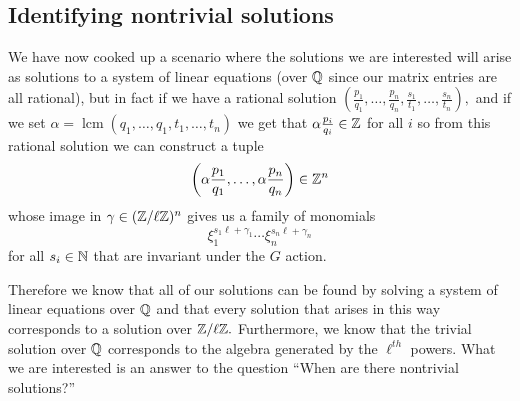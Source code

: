 \documentclass [11pt, proquest] {uwthesis}[2020/02/24]
\begin{document}
{\subsection{Identifying nontrivial solutions}
    We have now cooked up a scenario where the solutions we are interested will arise as solutions to a system of linear equations (over $\mathbb{Q}$ since our matrix entries are all rational), but in fact if we have a rational solution $(\frac{p_1}{q_1},\dots,\frac{p_n}{q_n},\frac{s_1}{t_1},\dots,\frac{s_n}{t_n}),$ and if we set $\alpha=\operatorname{lcm}(q_1,\dots,q_1,t_1,\dots,t_n)$ we get that $\alpha \frac{p_i}{q_i}\in\mathbb{Z}$ for all $i$ so from this rational solution we can construct a tuple
    \[\left(\alpha \frac{p_1}{q_1},\dots,\alpha \frac{p_n}{q_n}\right)\in\mathbb{Z}^n\]
    whose image in $\gamma\in (\mathbb{Z}/\ell\mathbb{Z})^n$ gives us a family of monomials
    \[\xi_1^{s_1\ell + \gamma_1}\cdots\xi_n^{s_n\ell + \gamma_n}\]
    for all $s_i\in\mathbb{N}$ that are invariant under the $G$ action.
    
    Therefore we know that all of our solutions can be found by solving a system of linear equations over $\mathbb{Q}$ and that every solution that arises in this way corresponds to a solution over $\mathbb{Z}/\ell\mathbb{Z}.$ Furthermore, we know that the trivial solution over $\mathbb{Q}$ corresponds to the algebra generated by the $\ell^{th}$ powers. What we are interested is an answer to the question ``When are there nontrivial solutions?''
    
}
\end{document}
